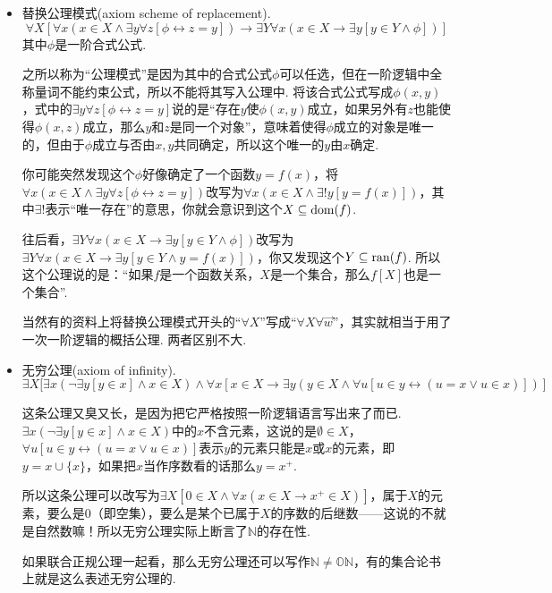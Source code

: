\begin{itemize}
\begin{note}
        同理，包含所有集合的集合也是不存在的，即\(\mathbb{V}\)不是一个集合，因为如果是的话，就有\(\mathbb{V}\in\mathbb{V}\)，违背正规公理.
    \end{note}
    
    \item[(5)] 替换公理模式(axiom scheme of replacement).
    \[\forall X [\forall x(x \in X \wedge \exists y \forall z[\phi \leftrightarrow z=y]) \rightarrow \exists Y \forall x(x \in X \rightarrow \exists y[y \in Y \wedge \phi])]\]
    其中\(\phi\)是一阶合式公式.
    \begin{note}
        之所以称为“公理模式”是因为其中的合式公式\(\phi\)可以任选，但在一阶逻辑中全称量词不能约束公式，所以不能将其写入公理中. 将该合式公式写成\(\phi(x,y)\)，式中的\(\exists y \forall z[\phi \leftrightarrow z=y]\)说的是“存在\(y\)使\(\phi(x,y)\)成立，如果另外有\(z\)也能使得\(\phi(x,z)\)成立，那么\(y\)和\(z\)是同一个对象”，意味着使得\(\phi\)成立的对象是唯一的，但由于\(\phi\)成立与否由\(x,y\)共同确定，所以这个唯一的\(y\)由\(x\)确定. 

        你可能突然发现这个\(\phi\)好像确定了一个函数\(y=f(x)\)，将\(\forall x(x \in X \wedge \exists y \forall z[\phi \leftrightarrow z=y])\)改写为\(\forall x(x \in X \wedge \exists! y [y=f(x)])\)，其中\(\exists!\)表示“唯一存在”的意思，你就会意识到这个\(X \subseteq {\rm dom}(f)\).
        
        往后看，\(\exists Y \forall x(x \in X \rightarrow \exists y[y \in Y \wedge \phi])\)改写为\(\exists Y \forall x(x \in X \rightarrow \exists y[y \in Y \wedge y=f(x)])\)，你又发现这个\(Y\subseteq {\rm ran}(f)\). 所以这个公理说的是：“如果\(f\)是一个函数关系，\(X\)是一个集合，那么\(f[X]\)也是一个集合”.

        当然有的资料上将替换公理模式开头的“\(\forall X\)”写成“\(\forall X \forall \vec{w}\)”，其实就相当于用了一次一阶逻辑的概括公理. 两者区别不大.
    \end{note}

    \item[(6)] 无穷公理(axiom of infinity).
    \[\exists X[ \exists x(\neg \exists y[y \in x] \wedge x \in X) \wedge \forall x[x \in X \rightarrow \exists y (y \in X \wedge \forall u[u \in y \leftrightarrow (u=x \vee u \in x)])]\]
    \begin{note}
        这条公理又臭又长，是因为把它严格按照一阶逻辑语言写出来了而已. \(\exists x(\neg \exists y[y \in x] \wedge x \in X)\)中的\(x\)不含元素，这说的是\(\emptyset \in X\)，\(\forall u[u \in y \leftrightarrow (u=x \vee u \in x)]\)表示\(y\)的元素只能是\(x\)或\(x\)的元素，即\(y=x \cup \{x\}\)，如果把\(x\)当作序数看的话那么\(y=x^+\).

        所以这条公理可以改写为\(\exists X[0 \in X \wedge \forall x(x \in X \rightarrow x^+ \in X)]\)，属于\(X\)的元素，要么是0（即空集），要么是某个已属于\(X\)的序数的后继数——这说的不就是自然数嘛！所以无穷公理实际上断言了\(\mathbb{N}\)的存在性.

        如果联合正规公理一起看，那么无穷公理还可以写作\(\mathbb{N} \neq \mathbb{ON}\)，有的集合论书上就是这么表述无穷公理的.
    \end{note}
\end{itemize}

